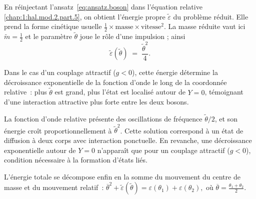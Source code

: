En réinjectant l’ansatz~\eqref{eq:ansatz.boson} dans l’équation relative
\eqref{chap:1:hal.mod.2.part.5}, on obtient l’énergie propre
\(\tilde{\varepsilon}\) du problème réduit.  
Elle prend la forme cinétique usuelle
\(\tfrac{1}{2}\times\text{masse}\times\text{vitesse}^{2}\).  
La masse réduite vaut ici \(\tilde{m}= \frac{1}{2}\) et le paramètre
\(\tilde{\theta}\) joue le rôle d’une impulsion ; ainsi
\begin{equation}
   \tilde{\varepsilon}(\tilde{\theta})
   \;=\;\frac{\tilde{\theta}^{2}}{4}.
   \label{eq:energie_relative}
\end{equation}




Dans le cas d’un couplage attractif ($g<0$), cette énergie détermine la décroissance exponentielle de la fonction d’onde le long de la coordonnée relative : plus \(\tilde{\theta}\) est grand, plus l’état est localisé autour de \(Y=0\), témoignant d’une interaction attractive plus forte entre les deux bosons.

La fonction d’onde relative présente des oscillations de fréquence \(\tilde{\theta}/2\), et son énergie croît proportionnellement à \(\tilde{\theta}^2\). Cette solution correspond à un état de diffusion à deux corps avec interaction ponctuelle. En revanche, une décroissance exponentielle autour de \(Y=0\) n’apparaît que pour un couplage attractif ($g<0$), condition nécessaire à la formation d’états liés.





L’énergie totale se décompose enfin en la somme du mouvement du centre
de masse et du mouvement relatif :
\(
   \overline{\theta}^{2}
   +
   \tilde{\varepsilon}(\tilde{\theta})
   =
   \varepsilon(\theta_{1})
   +
   \varepsilon(\theta_{2}),
\)
 où \(\overline{\theta}= \tfrac{\theta_{1}+\theta_{2}}{2}\).



